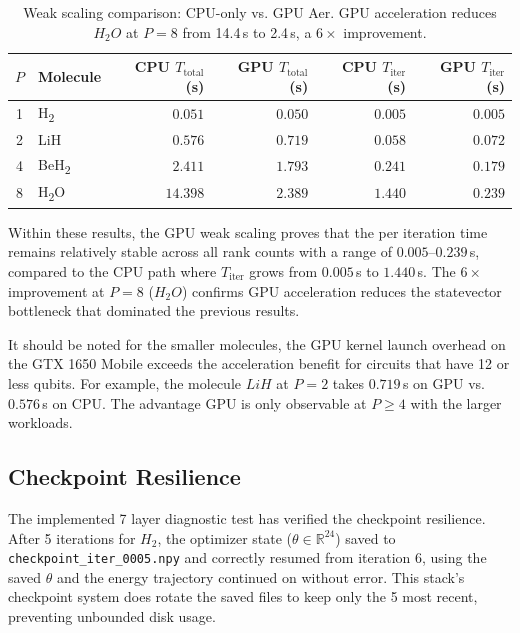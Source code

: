 \begin{table}[htbp]
\centering
\renewcommand{\arraystretch}{1.2}
\caption{Weak scaling comparison: CPU-only vs. GPU Aer. GPU acceleration reduces $H_{2}O$ at $P=8$ from 14.4\,s to 2.4\,s, a $6\times$ improvement.}
\label{table:gpu_weak_scaling}
\begin{tabular}{|c|l|r|r|r|r|}
\hline
\textbf{$P$} & \textbf{Molecule} & \textbf{CPU $T_{\text{total}}$ (s)} & \textbf{GPU $T_{\text{total}}$ (s)} & \textbf{CPU $T_{\text{iter}}$ (s)} & \textbf{GPU $T_{\text{iter}}$ (s)} \\ \hline
1 & H\textsubscript{2}  & $0.051$ & $0.050$ & $0.005$ & $0.005$ \\ \hline
2 & LiH & $0.576$ & $0.719$ & $0.058$ & $0.072$ \\ \hline
4 & BeH\textsubscript{2} & $2.411$ & $1.793$ & $0.241$ & $0.179$ \\ \hline
8 & H\textsubscript{2}O  & $14.398$ & $2.389$ & $1.440$ & $0.239$ \\ \hline
\end{tabular}
\end{table}

Within these results, the GPU weak scaling proves that the per iteration time remains relatively stable across all rank 
counts with a range of $0.005$--$0.239$\,s, compared to the CPU path where $T_{\text{iter}}$ grows from $0.005$\,s to $1.440$\,s. 
The $6\times$ improvement at $P=8$ ($H_{2}O$) confirms GPU acceleration reduces the 
statevector bottleneck that dominated the previous results.

It should be noted for the smaller molecules, the GPU kernel launch overhead on the GTX 1650 Mobile exceeds the 
acceleration benefit for circuits that have 12 or less qubits. For example, the molecule $LiH$ at $P=2$ takes $0.719$\,s on GPU vs. $0.576$\,s on CPU. 
The advantage GPU is only observable at $P \geq 4$ with the larger workloads.

\subsection{Checkpoint Resilience}
The implemented 7 layer diagnostic test has verified the checkpoint resilience. After 5 iterations for 
$H_{2}$, the optimizer state ($\theta \in \mathbb{R}^{24}$) saved to \texttt{checkpoint\_iter\_0005.npy} and 
correctly resumed from iteration 6, using the saved $\theta$ and the energy 
trajectory continued on without error. This stack's checkpoint system does rotate the saved files to keep 
only the 5 most recent, preventing unbounded disk usage.

